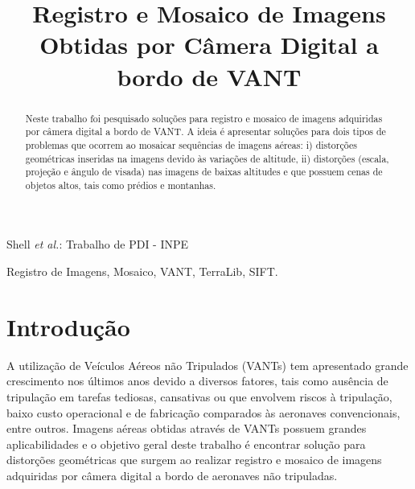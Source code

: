 \documentclass[9pt, a4paper, nofonttune, journal]{IEEEtran}
\begin{document}
\title{Registro e Mosaico de Imagens \\Obtidas por Câmera Digital a bordo de VANT}

\author{
}

%
{Shell \MakeLowercase{\textit{et al.}}: Trabalho de PDI - INPE}

\maketitle               
\renewcommand\abstractname{Resumo}
\renewcommand{\refname}{Referências}
\renewcommand\IEEEkeywordsname{Palavras-chave}


\begin{abstract}
Neste trabalho foi pesquisado soluções para registro e mosaico de imagens adquiridas por câmera digital a bordo de VANT. A ideia é apresentar soluções para dois tipos de problemas que ocorrem ao mosaicar sequências de imagens aéreas: i) distorções geométricas inseridas na imagens devido às variações de altitude, ii) distorções (escala, projeção e ângulo de visada) nas imagens de baixas altitudes e que possuem cenas de objetos altos, tais como prédios e montanhas.
\end{abstract}

\begin{IEEEkeywords}
Registro de Imagens, Mosaico, VANT, TerraLib, SIFT.
\end{IEEEkeywords}

\section{Introdução}
A utilização de Veículos Aéreos não Tripulados (VANTs) tem apresentado grande crescimento nos últimos anos devido a diversos fatores, 
tais como ausência de tripulação em tarefas tediosas, cansativas ou que envolvem riscos à tripulação, 
baixo custo operacional e de fabricação comparados às aeronaves convencionais, entre outros. 
Imagens aéreas obtidas através de VANTs possuem grandes aplicabilidades \cite{Canhoto}
 e o objetivo geral deste trabalho é encontrar solução para distorções geométricas que surgem ao realizar registro e mosaico de imagens adquiridas por câmera digital a bordo de aeronaves não tripuladas.
\end{document}

